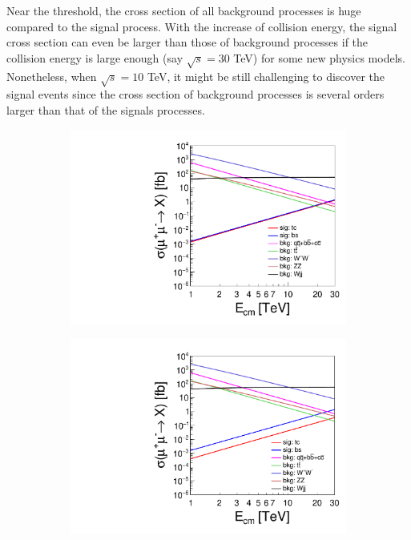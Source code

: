 \documentclass[a4paper,11pt]{article}
\begin{document}
Near the threshold, the cross section of all background processes is huge compared to the signal process. 
With the increase of collision energy, 
the signal cross section can even be larger than those of background processes if the collision energy is large enough (say $\sqrt{s}=30$ TeV) for some new physics models. 
Nonetheless, when $\sqrt{s}=10$ TeV, it might be still challenging to discover the signal events since the cross section of background processes is several orders larger than that of the signals processes.

\begin{figure}
  \centering
  \captionsetup[sub]{font=large}
  \begin{subfigure}[t]{0.45\textwidth}
     \includegraphics[width=\linewidth]{e_sigma_clq1_only_log.pdf}
     \caption{}
  \end{subfigure}
  \begin{subfigure}[t]{0.45\textwidth}
     \includegraphics[width=\linewidth]{e_sigma_clq1_eq_3clq3_log.pdf}

\end{subfigure}
\end{figure}
\end{document}
